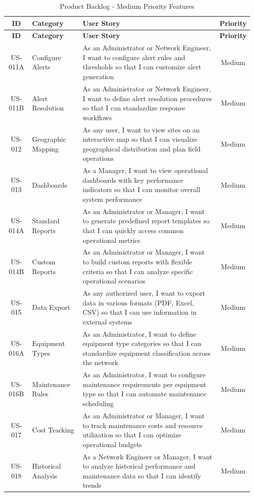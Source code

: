 \begin{longtable}{|c|p{2.8cm}|p{8.2cm}|c|}
\caption{Product Backlog - Medium Priority Features} \\
\hline
\textbf{ID} & \textbf{Category} & \textbf{User Story} & \textbf{Priority} \\
\hline
\endfirsthead
\hline
\textbf{ID} & \textbf{Category} & \textbf{User Story} & \textbf{Priority} \\
\hline
\endhead

US-011A & Configure Alerts & As an Administrator or Network Engineer, I want to configure alert rules and thresholds so that I can customize alert generation & Medium \\
\hline
US-011B & Alert Resolution & As an Administrator or Network Engineer, I want to define alert resolution procedures so that I can standardize response workflows & Medium \\
\hline
US-012 & Geographic Mapping & As any user, I want to view sites on an interactive map so that I can visualize geographical distribution and plan field operations & Medium \\
\hline
US-013 & Dashboards & As a Manager, I want to view operational dashboards with key performance indicators so that I can monitor overall system performance & Medium \\
\hline
US-014A & Standard Reports & As an Administrator or Manager, I want to generate predefined report templates so that I can quickly access common operational metrics & Medium \\
\hline
US-014B & Custom Reports & As an Administrator or Manager, I want to build custom reports with flexible criteria so that I can analyze specific operational scenarios & Medium \\
\hline
US-015 & Data Export & As any authorized user, I want to export data in various formats (PDF, Excel, CSV) so that I can use information in external systems & Medium \\
\hline
US-016A & Equipment Types & As an Administrator, I want to define equipment type categories so that I can standardize equipment classification across the network & Medium \\
\hline
US-016B & Maintenance Rules & As an Administrator, I want to configure maintenance requirements per equipment type so that I can automate maintenance scheduling & Medium \\
\hline
US-017 & Cost Tracking & As an Administrator or Manager, I want to track maintenance costs and resource utilization so that I can optimize operational budgets & Medium \\
\hline
US-018 & Historical Analysis & As a Network Engineer or Manager, I want to analyze historical performance and maintenance data so that I can identify trends & Medium \\
\hline
\end{longtable}

